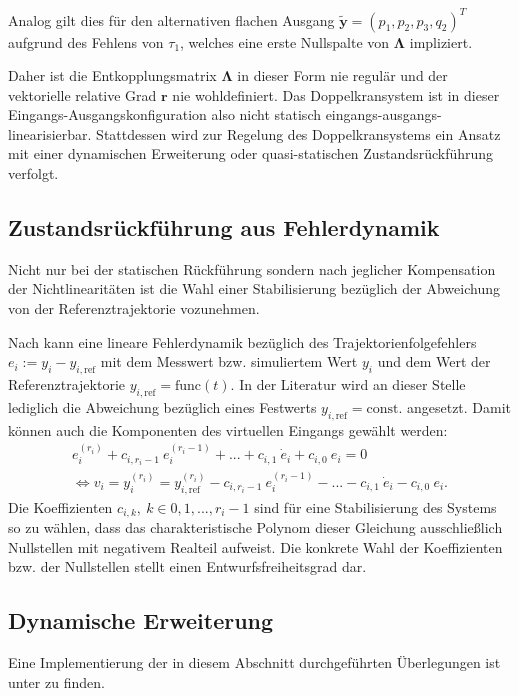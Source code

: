 Analog gilt dies für den alternativen flachen Ausgang $\tilde{\mathbf{y}} = (p_1, p_2, p_3, q_2)^T$ aufgrund des Fehlens von $\tau_1$, welches eine erste Nullspalte von $\boldsymbol{\Lambda}$ impliziert.

Daher ist die Entkopplungsmatrix $\boldsymbol{\Lambda}$ in dieser Form nie regulär und der vektorielle relative Grad $\mathbf{r}$ nie wohldefiniert. Das Doppelkransystem ist in dieser Eingangs-Ausgangskonfiguration also nicht statisch eingangs-ausgangs-linearisierbar. Stattdessen wird zur Regelung des Doppelkransystems ein Ansatz mit einer dynamischen Erweiterung oder quasi-statischen Zustandsrückführung verfolgt. 

\subsection{Zustandsrückführung aus Fehlerdynamik}
\label{sec:error_dynamics}
Nicht nur bei der statischen Rückführung sondern nach jeglicher Kompensation der Nichtlinearitäten ist die Wahl einer Stabilisierung bezüglich der Abweichung von der Referenztrajektorie vozunehmen.

Nach \cite[S. 195]{NLRT_Roebenack} kann eine lineare Fehlerdynamik bezüglich des Trajektorienfolgefehlers $e_i := y_i - y_{i, \text{ref}}$ mit dem Messwert bzw. simuliertem Wert $y_i$ und dem Wert der Referenztrajektorie $y_{i, \text{ref}} = \mathrm{func}(t)$. In der Literatur wird an dieser Stelle lediglich die Abweichung bezüglich eines Festwerts $y_{i, \text{ref}} = \mathrm{const.}$ angesetzt. Damit können auch die Komponenten des virtuellen Eingangs gewählt werden:
\begin{align}
	e_i^{(r_i)} + c_{i, r_i-1} \ e_i^{(r_i-1)} + ... + c_{i, 1} \ \dot{e}_i + c_{i, 0} \ e_i = 0 
	\\
	\Leftrightarrow v_i = y_i^{(r_i)} = y_{i, \text{ref}}^{(r_i)} - c_{i, r_i-1} \ e_i^{(r_i-1)} - ... - c_{i, 1} \ \dot{e}_i - c_{i, 0} \ e_i.
\end{align}
Die Koeffizienten $c_{i, k}, \ k \in {0, 1, ..., r_i-1}$ sind für eine Stabilisierung des Systems so zu wählen, dass das charakteristische Polynom dieser Gleichung ausschließlich Nullstellen mit negativem Realteil aufweist. Die konkrete Wahl der Koeffizienten bzw. der Nullstellen stellt einen Entwurfsfreiheitsgrad dar.

\subsection{Dynamische Erweiterung}
\label{sec_dynamic_extension_control}
Eine Implementierung der in diesem Abschnitt durchgeführten Überlegungen ist unter \cite[flatness\_notebooks/ODE\_flatness\_trajectory\_control\_simulation\_dyn.ipynb]{SAGithub} zu finden.

